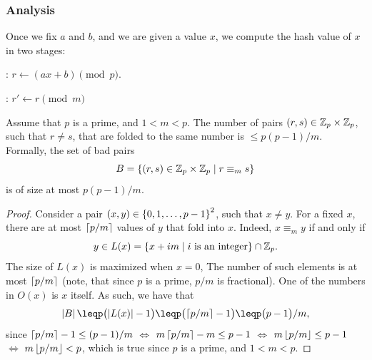 \subsubsection{Analysis}

Once we fix $a$ and $b$, and we are given a value $x$, we compute the
hash value of $x$ in two stages:
\begin{compactenumA}
    \item {}: $r \leftarrow (a x + b) \pmod p$.
    
    \item {}: $r' \leftarrow r \pmod m$%
\end{compactenumA}

\begin{lemma}
    Assume that $p$ is a prime, and $1 < m < p$.  The number of pairs
    $(r,s) \in \mathbb{Z}_p \times \mathbb{Z}_p$, such that $r \neq s$, that are
    folded to the same number is $\leq p(p-1)/m$.  Formally, the set
    of bad pairs
    \begin{equation*}
        B = \left\{ (r,s) \in \mathbb{Z}_p \times \mathbb{Z}_p \;\middle\vert\;  r \equiv_m s   \right\}
    \end{equation*}
    is of size at most $p(p-1)/m$.
\end{lemma}
\begin{proof}
    Consider a pair $(x,y) \in \left\{ {0, 1,\ldots, p-1} \right\}^2$, such that
    $x \neq y$. For a fixed $x$, there are at most $\left\lceil {p/m} \right\rceil$ values
    of $y$ that fold into $x$. Indeed, $x \equiv_m y$ if and only if
    \begin{equation*}
        y \in L(x) = \left\{ x + im  \;\middle\vert\; i \text { is an integer} \right\} \cap \mathbb{Z}_p.
    \end{equation*}
    The size of $L(x)$ is maximized when $x = 0$, The number of such
    elements is at most $\left\lceil {p/m} \right\rceil$ (note, that since $p$ is a prime,
    $p/m$ is fractional).  One of the numbers in $O(x)$ is $x$ itself.
    As such, we have that
    \begin{equation*}
        \cardin{B}%
        \leq%
        p \bigl(\cardin{L(x)}  - 1 \bigr)%
        \leq%
        p \bigl(\ceil{p/m} - 1 \bigr)
        \leq%
        p \bigl(p - 1 \bigr)/m,
    \end{equation*}
    since
    $\left\lceil {p/m} \right\rceil - 1 \leq (p-1)/m$
    $\iff$
    $m\left\lceil {p/m} \right\rceil - m \leq p-1$
    $\iff$
    $m\left\lfloor {p/m} \right\rfloor \leq p-1$
    $\iff$
    $m\left\lfloor {p/m} \right\rfloor < p$,
    which is true since $p$ is a prime, and $1 <m < p$.    
\end{proof}



